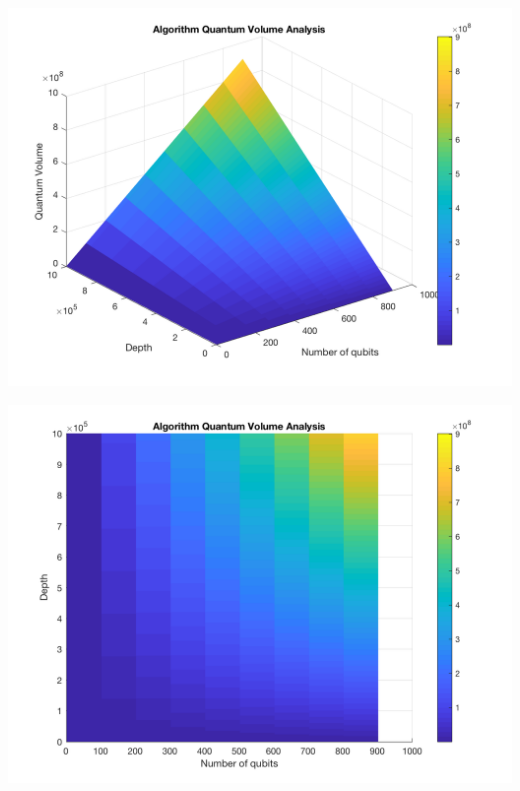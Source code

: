 \documentclass[11pt]{article}
\begin{document}
\begin{minipage}{.45\textwidth}

\centering

\begin{center}
\includegraphics[width=.9\linewidth]{V_q_analysis_mult2.png}
\end{center}

\label{fig:algorithmmultQV2}

\end{minipage}%
\hspace{1cm}
\begin{minipage}{.45\textwidth}

\begin{center}
\includegraphics[width=.9\linewidth]{V_q_analysis_mult1.png}
\end{center}

\label{fig:algorithmmultQV1}

\end{minipage}%
\end{document}
